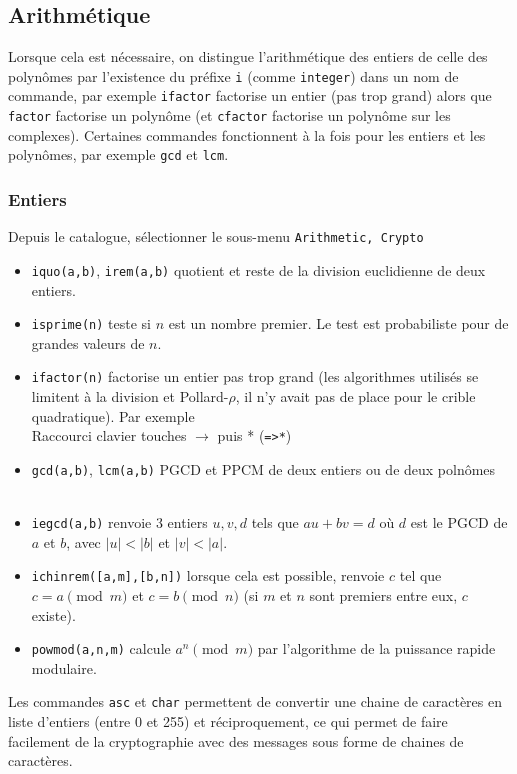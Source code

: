 \documentclass{article}
\begin{document}
\begin{giacjshere}
\subsection{Arithm\'etique}
Lorsque cela est n\'ecessaire,
on distingue l'arithm\'etique des entiers de celle des polyn\^omes
par l'existence du pr\'efixe \verb|i| (comme \verb|integer|) dans
un nom de commande, par exemple \verb|ifactor| factorise un entier
(pas trop grand) alors que \verb|factor| factorise un polyn\^ome
(et \verb|cfactor| factorise un polyn\^ome sur les complexes).
Certaines commandes fonctionnent \`a la fois pour les entiers et
les polyn\^omes, par exemple \verb|gcd| et \verb|lcm|.

\subsubsection{Entiers}
Depuis le catalogue, s\'electionner le sous-menu \verb|Arithmetic, Crypto|
\begin{itemize}
\item \verb|iquo(a,b)|, 
\verb|irem(a,b)| quotient et reste de la division euclidienne
de deux entiers.\\
\item \verb|isprime(n)| teste si $n$ est un nombre premier.
Le test est probabiliste pour de grandes valeurs de $n$.
\item \verb|ifactor(n)| factorise un entier pas trop grand
(les algorithmes utilis\'es se limitent \`a la division et Pollard-$\rho$,
il n'y avait pas de place pour le crible quadratique).
Par exemple
\\
Raccourci clavier touches $\rightarrow$ puis * (\verb|=>*|)
\item \verb|gcd(a,b)|, \verb|lcm(a,b)| PGCD et PPCM de deux entiers
ou de deux poln\^omes\\
\\
\item \verb|iegcd(a,b)| renvoie 3 entiers $u,v,d$ tels que
$au+bv=d$ o\`u $d$ est le PGCD de $a$ et $b$, avec $|u|<|b|$ et
$|v|<|a|$.\\
\item \verb|ichinrem([a,m],[b,n])| lorsque cela est possible,
renvoie $c$ tel que $c=a \pmod m$ et $c=b \pmod n$ (si $m$ et $n$
sont premiers entre eux, $c$ existe).
\item \verb|powmod(a,n,m)| calcule $a^n \pmod m$ par
l'algorithme de la puissance rapide modulaire.
\end{itemize}
Les commandes \verb|asc| et \verb|char| permettent de convertir
une chaine de caract\`eres en liste d'entiers (entre 0 et 255) et
r\'eciproquement, ce qui permet de faire facilement de la cryptographie
avec des messages sous forme de chaines de caract\`eres.


\end{giacjshere}
\end{document}
